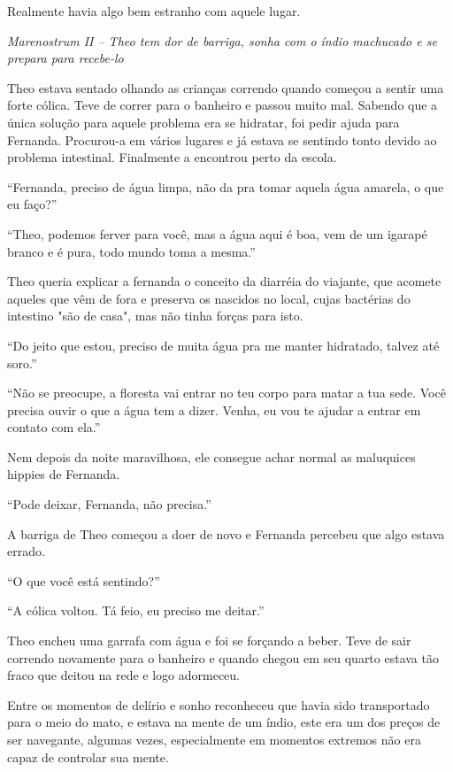Realmente havia algo bem estranho com aquele lugar.

\asterisc

\emph{Marenostrum II -- Theo tem dor de barriga, sonha com o índio
machucado e se prepara para recebe-lo}

Theo estava sentado olhando as
crianças correndo quando começou a sentir uma forte cólica. Teve de
correr para o banheiro e passou muito mal. Sabendo que a única solução
para aquele problema era se hidratar, foi pedir ajuda para Fernanda.
Procurou-a em vários lugares e já estava se sentindo tonto devido ao
problema intestinal. Finalmente a encontrou perto da escola.

``Fernanda, preciso de água limpa, não da pra tomar aquela água amarela,
o que eu faço?''

``Theo, podemos ferver para você, mas a água aqui é boa, vem de um
igarapé branco e é pura, todo mundo toma a mesma.''

Theo queria explicar a fernanda o conceito da diarréia do viajante, que
acomete aqueles que vêm de fora e preserva os nascidos no local, cujas
bactérias do intestino "são de casa", mas não tinha forças para isto.

``Do jeito que estou, preciso de muita água pra me manter hidratado,
talvez até soro.''

``Não se preocupe, a floresta vai entrar no teu corpo para matar a tua
sede. Você precisa ouvir o que a água tem a dizer. Venha, eu vou te
ajudar a entrar em contato com ela.''

Nem depois da noite maravilhosa, ele consegue achar normal as maluquices
hippies de Fernanda.

``Pode deixar, Fernanda, não precisa.''

A barriga de Theo começou a doer de novo e Fernanda percebeu que algo
estava errado.

``O que você está sentindo?''

``A cólica voltou. Tá feio, eu preciso me deitar.''

Theo encheu uma garrafa com água e foi se forçando a beber. Teve de sair
correndo novamente para o banheiro e quando chegou em seu quarto estava
tão fraco que deitou na rede e logo adormeceu.

Entre os momentos de delírio e sonho reconheceu que havia sido
transportado para o meio do mato, e estava na mente de um índio, este
era um dos preços de ser navegante, algumas vezes, especialmente em
momentos extremos não era capaz de controlar sua mente.

